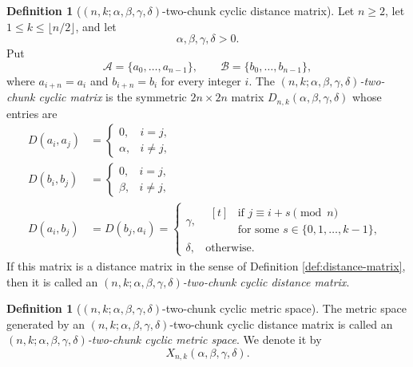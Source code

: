\documentclass[11pt]{amsart}
\numberwithin{equation}{section}
\theoremstyle{definition}
\newtheorem{definition}[theorem]{Definition}
\theoremstyle{remark}
\newcommand{\cA}{\mathcal{A}}
\newcommand{\cB}{\mathcal{B}}
\begin{document}
\begin{definition}[\((n,k;\alpha,\beta,\gamma,\delta)\)-two-chunk cyclic distance matrix]\label{def:two-chunk-matrix}
Let \(n\geq 2\), let \(1\leq k\leq \lfloor n/2\rfloor\), and let
\begin{equation}\label{eq:parameters-positive}
\alpha,\beta,\gamma,\delta>0.
\end{equation}
Put
\begin{equation}\label{eq:two-block-set}
\cA=\{a_0,\ldots,a_{n-1}\},\qquad
\cB=\{b_0,\ldots,b_{n-1}\},
\end{equation}
where \(a_{i+n}=a_i\) and \(b_{i+n}=b_i\) for every integer \(i\).  The \emph{\((n,k;\alpha,\beta,\gamma,\delta)\)-two-chunk cyclic matrix} is the symmetric \(2n\times 2n\) matrix \(D_{n,k}(\alpha,\beta,\gamma,\delta)\) whose entries are
\begin{align}
D(a_i,a_j)&=
\begin{cases}
0,& i=j,\\
\alpha,& i\neq j,
\end{cases}
\label{eq:A-block-distance}\\
D(b_i,b_j)&=
\begin{cases}
0,& i=j,\\
\beta,& i\neq j,
\end{cases}
\label{eq:B-block-distance}\\
D(a_i,b_j)&=D(b_j,a_i)=
\begin{cases}
\gamma,&
\begin{aligned}[t]
&\text{if } j\equiv i+s \pmod{n}\\
&\text{for some } s\in\{0,1,\ldots,k-1\},
\end{aligned}\\
\delta,& \text{otherwise}.
\end{cases}
\label{eq:cross-block-distance}
\end{align}
If this matrix is a distance matrix in the sense of Definition \ref{def:distance-matrix}, then it is called an \emph{\((n,k;\alpha,\beta,\gamma,\delta)\)-two-chunk cyclic distance matrix}.
\end{definition}

\begin{definition}[\((n,k;\alpha,\beta,\gamma,\delta)\)-two-chunk cyclic metric space]\label{def:two-chunk-space}
The metric space generated by an \((n,k;\alpha,\beta,\gamma,\delta)\)-two-chunk cyclic distance matrix is called an \emph{\((n,k;\alpha,\beta,\gamma,\delta)\)-two-chunk cyclic metric space}.  We denote it by
\begin{equation}\label{eq:two-chunk-space-notation}
X_{n,k}(\alpha,\beta,\gamma,\delta).
\end{equation}
\end{definition}
\end{document}
